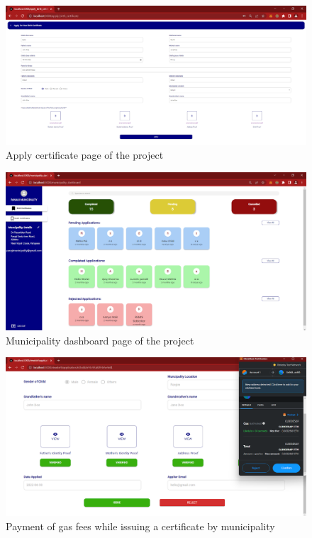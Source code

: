     \begin{figure}[H]
        \centering
        \includegraphics[width=\textwidth]{imgs/applycertificatepage.png}
        \caption{Apply certificate page of the project}
        \label{fig:Apply certificate page of the project}
        \end{figure}

    \begin{figure}[H]
        \centering
        \includegraphics[width=\textwidth]{imgs/municipalitypage.png}
        \caption{Municipality dashboard page of the project}
        \label{fig:Municipality dashboard page of the project}
        \end{figure}

    \begin{figure}[H]
        \centering
        \includegraphics[width=\textwidth]{imgs/grantingcertificate.png}
        \caption{Payment of gas fees while issuing a certificate by municipality}
        \label{fig:Payment of gas fees while issuing a certificate by municipality}
        \end{figure}

